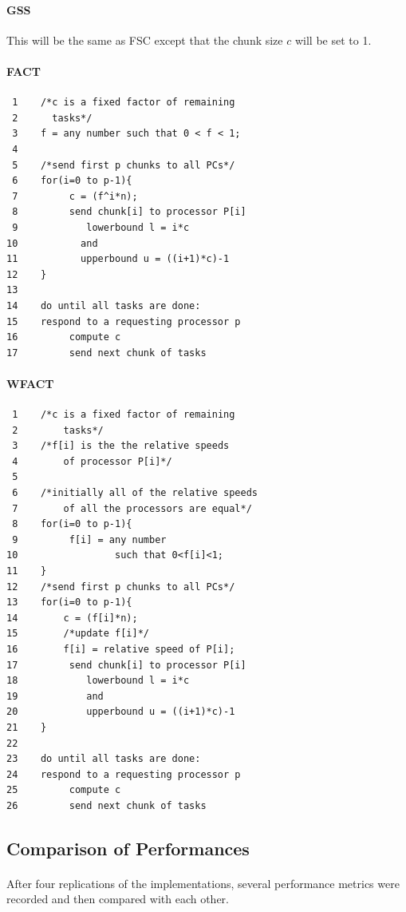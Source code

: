 \documentclass[10pt, twocolumn, letterpaper]{article}
\begin{document}
\paragraph{\textsf{GSS}}
This will be the same as FSC except that the chunk size $c$ will be set to 1.\\

\paragraph{\textsf{FACT}}
\begin{verbatim}
 1    /*c is a fixed factor of remaining
 2      tasks*/
 3    f = any number such that 0 < f < 1;
 4
 5    /*send first p chunks to all PCs*/
 6    for(i=0 to p-1){
 7         c = (f^i*n);
 8         send chunk[i] to processor P[i]
 9            lowerbound l = i*c
10           and
11           upperbound u = ((i+1)*c)-1
12    }
13
14    do until all tasks are done:
15    respond to a requesting processor p
16         compute c
17         send next chunk of tasks
\end{verbatim}

\paragraph{\textsf{WFACT}}
\begin{verbatim}
 1    /*c is a fixed factor of remaining
 2        tasks*/
 3    /*f[i] is the the relative speeds
 4        of processor P[i]*/
 5
 6    /*initially all of the relative speeds
 7        of all the processors are equal*/ 
 8    for(i=0 to p-1){
 9         f[i] = any number
10                 such that 0<f[i]<1;
11    } 
12    /*send first p chunks to all PCs*/
13    for(i=0 to p-1){
14        c = (f[i]*n);
15        /*update f[i]*/
16        f[i] = relative speed of P[i];
17         send chunk[i] to processor P[i]
18            lowerbound l = i*c
19            and
20            upperbound u = ((i+1)*c)-1
21    }
22
23    do until all tasks are done:
24    respond to a requesting processor p
25         compute c
26         send next chunk of tasks
\end{verbatim}

\subsection{Comparison of Performances}

\paragraph{}
After four replications of the implementations, several performance metrics were recorded and then compared with each other.
\end{document}
